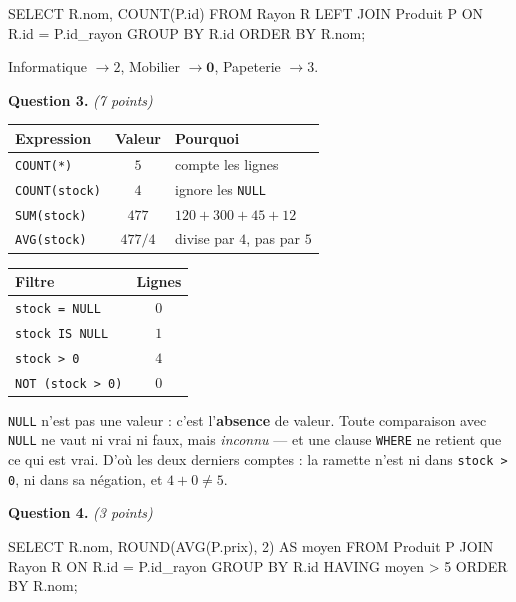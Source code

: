 \begin{sql}
SELECT R.nom, COUNT(P.id)
FROM Rayon R LEFT JOIN Produit P ON R.id = P.id_rayon
GROUP BY R.id ORDER BY R.nom;
\end{sql}

Informatique $\rightarrow 2$, Mobilier $\rightarrow \mathbf{0}$, Papeterie
$\rightarrow 3$.

\medskip
\textbf{Question 3.} \emph{(7 points)}

\begin{center}
\begin{tabular}{|l|c|l|}
\hline
\textbf{Expression} & \textbf{Valeur} & \textbf{Pourquoi} \\
\hline
\texttt{COUNT(*)} & $5$ & compte les lignes \\
\hline
\texttt{COUNT(stock)} & $4$ & ignore les \texttt{NULL} \\
\hline
\texttt{SUM(stock)} & $477$ & $120 + 300 + 45 + 12$ \\
\hline
\texttt{AVG(stock)} & $477/4$ & divise par $4$, pas par $5$ \\
\hline
\end{tabular}
\end{center}

\begin{center}
\begin{tabular}{|l|c|}
\hline
\textbf{Filtre} & \textbf{Lignes} \\
\hline
\texttt{stock = NULL} & $0$ \\
\hline
\texttt{stock IS NULL} & $1$ \\
\hline
\texttt{stock > 0} & $4$ \\
\hline
\texttt{NOT (stock > 0)} & $0$ \\
\hline
\end{tabular}
\end{center}

\lstinline{NULL} n'est pas une valeur : c'est l'\textbf{absence} de valeur.
Toute comparaison avec \lstinline{NULL} ne vaut ni vrai ni faux, mais
\emph{inconnu} — et une clause \lstinline{WHERE} ne retient que ce qui est
vrai. D'où les deux derniers comptes : la ramette n'est ni dans
\lstinline{stock > 0}, ni dans sa négation, et $4 + 0 \neq 5$.

\medskip
\textbf{Question 4.} \emph{(3 points)}

\begin{sql}
SELECT R.nom, ROUND(AVG(P.prix), 2) AS moyen
FROM Produit P JOIN Rayon R ON R.id = P.id_rayon
GROUP BY R.id HAVING moyen > 5 ORDER BY R.nom;
\end{sql}

